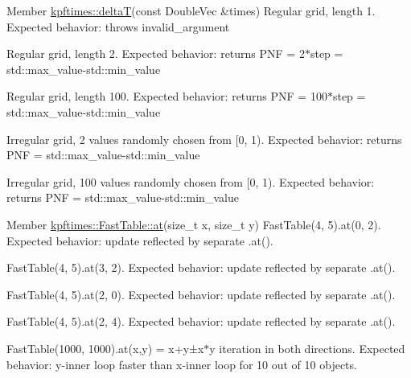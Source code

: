 \label{test__test000003}
\hypertarget{test__test000003}{}
 
\begin{DoxyDescription}
\item[Member \hyperlink{group__grid_gad3ff4682c1b247c928c495f29c3dc7a2}{kpftimes::deltaT}(const DoubleVec \&times) ]Regular grid, length 1. Expected behavior: throws invalid\_\-argument 

Regular grid, length 2. Expected behavior: returns PNF = 2$\ast$step = std::max\_\-value-\/std::min\_\-value 

Regular grid, length 100. Expected behavior: returns PNF = 100$\ast$step = std::max\_\-value-\/std::min\_\-value 

Irregular grid, 2 values randomly chosen from \mbox{[}0, 1). Expected behavior: returns PNF = std::max\_\-value-\/std::min\_\-value 

Irregular grid, 100 values randomly chosen from \mbox{[}0, 1). Expected behavior: returns PNF = std::max\_\-value-\/std::min\_\-value 
\end{DoxyDescription}

\label{test__test000008}
\hypertarget{test__test000008}{}
 
\begin{DoxyDescription}
\item[Member \hyperlink{classkpftimes_1_1_fast_table_a2afaf3ba8f1a699a85c943f278db5c67}{kpftimes::FastTable::at}(size\_\-t x, size\_\-t y) ]FastTable(4, 5).at(0, 2). Expected behavior: update reflected by separate .at(). 

FastTable(4, 5).at(3, 2). Expected behavior: update reflected by separate .at(). 

FastTable(4, 5).at(2, 0). Expected behavior: update reflected by separate .at(). 

FastTable(4, 5).at(2, 4). Expected behavior: update reflected by separate .at(). 

FastTable(1000, 1000).at(x,y) = x+y±x$\ast$y iteration in both directions. Expected behavior: y-\/inner loop faster than x-\/inner loop for 10 out of 10 objects. 
\end{DoxyDescription}

\label{test__test000005}
\hypertarget{test__test000005}{}
 
